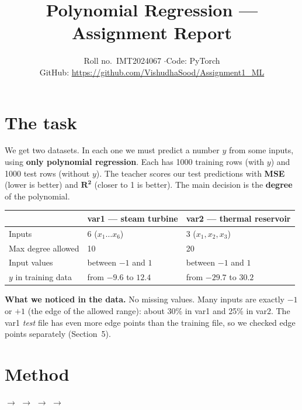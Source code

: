 \documentclass[11pt,a4paper]{article}
\title{Polynomial Regression --- Assignment Report}
\author{Roll no.\ IMT2024067 \quad$\cdot$\quad Code: PyTorch\\[2pt] \small GitHub: \url{https://github.com/VishudhaSood/Assignment1_ML}}
\date{}
\begin{document}
\maketitle
\vspace{-1.5em}

\section{The task}
We get two datasets. In each one we must predict a number $y$ from some inputs, using
\textbf{only polynomial regression}. Each has 1000 training rows (with $y$) and 1000 test rows
(without $y$). The teacher scores our test predictions with \textbf{MSE} (lower is better) and
$\mathbf{R^2}$ (closer to 1 is better). The main decision is the \textbf{degree} of the polynomial.

\begin{table}[H]
\centering
\begin{tabular}{lll}
\toprule
 & var1 --- steam turbine & var2 --- thermal reservoir \\
\midrule
Inputs & 6 ($x_1 \ldots x_6$) & 3 ($x_1, x_2, x_3$) \\
Max degree allowed & 10 & 20 \\
Input values & between $-1$ and $1$ & between $-1$ and $1$ \\
$y$ in training data & from $-9.6$ to $12.4$ & from $-29.7$ to $30.2$ \\
\bottomrule
\end{tabular}
\end{table}

\textbf{What we noticed in the data.} No missing values. Many inputs are exactly $-1$ or $+1$
(the edge of the allowed range): about 30\% in var1 and 25\% in var2. The var1 \emph{test} file has
even more edge points than the training file, so we checked edge points separately (Section~5).

\section{Method}
\begin{center}
\small
{} $\rightarrow$
 $\rightarrow$
 $\rightarrow$
 $\rightarrow$
\end{center}
\end{document}
